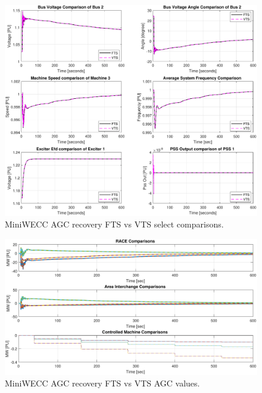 \begin{figure}[H]
	\centering
	\footnotesize
	\includegraphics[width=\linewidth]{examples/miniWECC/mwAGC-comparisons}
	\caption{MiniWECC AGC recovery FTS vs VTS select comparisons.}
	\label{fig: mwAGC comp}
\end{figure}%

\begin{figure}[H]
	\centering
	\footnotesize
	\includegraphics[width=\linewidth]{examples/miniWECC/mwAGC-AGCcalcs}
	\caption{MiniWECC AGC recovery FTS vs VTS AGC values.}
	\label{fig: mwAGC agc values}
\end{figure}%